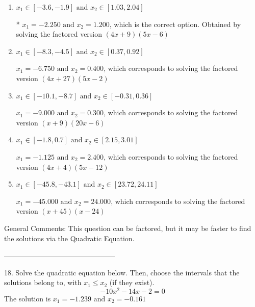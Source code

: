 \documentclass{extbook}[14pt]
\begin{document}
\begin{enumerate}[label=\Alph*.] 
\item $ x_1 \in [-3.6, -1.9] \text{ and } x_2 \in [1.03, 2.04] $ 

 * $x_1 = -2.250 \text{ and } x_2 = 1.200$, which is the correct option. Obtained by solving the factored version $(4x + 9)(5x -6)$ 
\item $ x_1 \in [-8.3, -4.5] \text{ and } x_2 \in [0.37, 0.92] $ 

 $x_1 = -6.750 \text{ and } x_2 = 0.400$, which corresponds to solving the factored version $(4x + 27)(5x -2)$ 
\item $ x_1 \in [-10.1, -8.7] \text{ and } x_2 \in [-0.31, 0.36] $ 

 $x_1 = -9.000 \text{ and } x_2 = 0.300$, which corresponds to solving the factored version $(x + 9)(20x -6)$ 
\item $ x_1 \in [-1.8, 0.7] \text{ and } x_2 \in [2.15, 3.01] $ 

 $x_1 = -1.125 \text{ and } x_2 = 2.400$, which corresponds to solving the factored version $(4x + 4)(5x -12)$ 
\item $ x_1 \in [-45.8, -43.1] \text{ and } x_2 \in [23.72, 24.11] $ 

 $x_1 = -45.000 \text{ and } x_2 = 24.000$, which corresponds to solving the factored version $(x + 45)(x -24)$ 
\end{enumerate} 
 
General Comments: This question can be factored, but it may be faster to find the solutions via the Quadratic Equation.

-----------------------------------------------

18. Solve the quadratic equation below. Then, choose the intervals that the solutions belong to, with $x_1 \leq x_2$ (if they exist).
\[ -10x^{2} -14 x -2 = 0 \] 
The solution is $ x_1 = -1.239 \text{ and } x_2 = -0.161 $ 
\end{document}

